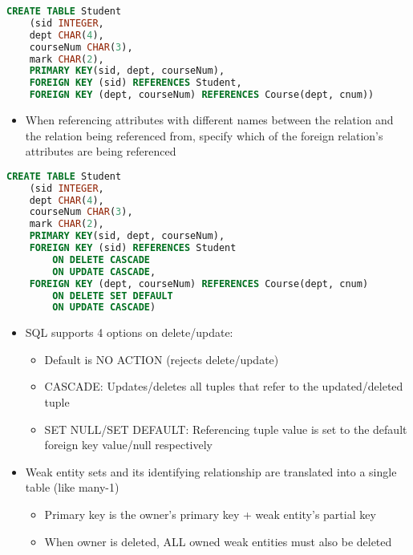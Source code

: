 \documentclass[8pt,landscape,a4paper, fleqn, dvipsnames]{extarticle}
\begin{document}
\begin{multicols*}{4}
\begin{itemize}
\begin{itemize}
    \end{itemize}
\end{itemize}
\begin{lstlisting}[language = SQL]
CREATE TABLE Student
    (sid INTEGER,
    dept CHAR(4),
    courseNum CHAR(3),
    mark CHAR(2),
    PRIMARY KEY(sid, dept, courseNum),
    FOREIGN KEY (sid) REFERENCES Student,
    FOREIGN KEY (dept, courseNum) REFERENCES Course(dept, cnum))
\end{lstlisting}
\begin{itemize}
    \item When referencing attributes with different names between the relation and the relation being referenced from, specify which of the foreign relation's attributes are being referenced
\end{itemize}
\begin{lstlisting}[language = SQL]
CREATE TABLE Student
    (sid INTEGER,
    dept CHAR(4),
    courseNum CHAR(3),
    mark CHAR(2),
    PRIMARY KEY(sid, dept, courseNum),
    FOREIGN KEY (sid) REFERENCES Student
        ON DELETE CASCADE
        ON UPDATE CASCADE,
    FOREIGN KEY (dept, courseNum) REFERENCES Course(dept, cnum)
        ON DELETE SET DEFAULT
        ON UPDATE CASCADE)
\end{lstlisting}
\begin{itemize}
    \item SQL supports 4 options on delete/update:
    \begin{itemize}
        \item Default is NO ACTION (rejects delete/update)
        \item CASCADE: Updates/deletes all tuples that refer to the updated/deleted tuple
        \item SET NULL/SET DEFAULT: Referencing tuple value is set to the default foreign key value/null respectively
    \end{itemize}
    \item Weak entity sets and its identifying relationship are translated into a single table (like many-1)
    \begin{itemize}
        \item Primary key is the owner's primary key + weak entity's partial key
        \item When owner is deleted, ALL owned weak entities must also be deleted
    \end{itemize}
\end{itemize}


\end{multicols*}
\end{document}
